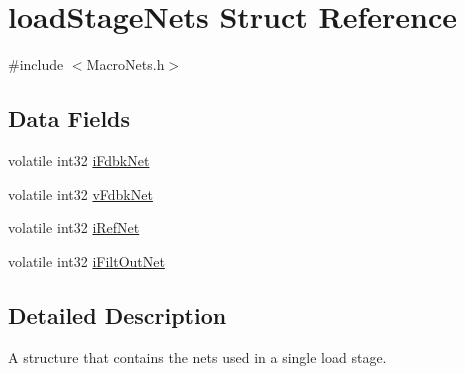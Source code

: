 \hypertarget{a00007}{\section{load\-Stage\-Nets Struct Reference}
\label{a00007}
}


{\ttfamily \#include $<$Macro\-Nets.\-h$>$}

\subsection*{Data Fields}
\begin{DoxyCompactItemize}
\item 
volatile int32 \hyperlink{a00007_aa580f4cffe5e06aef9a2448f5d7c7306}{i\-Fdbk\-Net}
\item 
volatile int32 \hyperlink{a00007_ac2c84f99c821ff9022e6792f338155f5}{v\-Fdbk\-Net}
\item 
volatile int32 \hyperlink{a00007_ac3bbae6daf15cd711f6caa262de6433b}{i\-Ref\-Net}
\item 
volatile int32 \hyperlink{a00007_aac9cfbda42e3756f1b41bede20f80420}{i\-Filt\-Out\-Net}
\end{DoxyCompactItemize}


\subsection{Detailed Description}
A structure that contains the nets used in a single load stage. 

